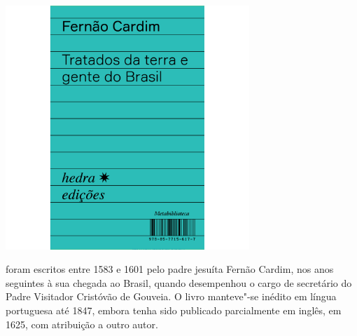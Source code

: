 \vfill

\hspace*{-.4cm}\begin{minipage}[c]{.5\linewidth}
\small{
{}}
\end{minipage}

\pagebreak

\begin{center}
\hspace*{-2.5cm}
\hspace*{2.5cm}\includegraphics[width=92mm]{./grid/cardim.jpg}
\end{center}

\hspace*{-7cm}\hrulefill\hspace*{-7cm}

\medskip

 foram escritos entre 1583 e 1601 pelo padre jesuíta Fernão Cardim, nos anos seguintes à sua chegada ao Brasil, quando desempenhou o cargo de secretário do Padre Visitador Cristóvão de Gouveia. O livro manteve"-se inédito em língua portuguesa até 1847, embora tenha sido publicado parcialmente em inglês, em 1625, com atribuição a outro autor.

